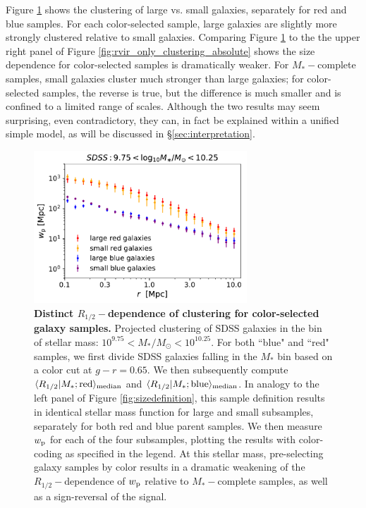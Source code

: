 \documentclass[usenatbib,usegraphicx,letterpaper]{mn2e}
\newcommand{\rhalf}{R_{1/2}}
\newcommand{\mstar}{M_{\ast}}
\newcommand{\wproj}{w_{\rm p}}
\newcommand{\median}[2]{\langle{#1}\vert{#2}\rangle_{\rm median}}
\newcommand{\msun}{M_\odot}
\begin{document}
Figure \ref{fig:colorclustering} shows the clustering of large vs. small galaxies, separately for red and blue samples. For each color-selected sample, large galaxies are slightly more strongly clustered relative to small galaxies. Comparing Figure \ref{fig:colorclustering} to the the upper right panel of Figure \ref{fig:rvir_only_clustering_absolute} shows the size dependence for color-selected samples is dramatically weaker.   For $\mstar-$complete samples, small galaxies cluster much stronger than large galaxies; for color-selected samples, the reverse is true, but the difference is much smaller and is confined to a limited range of scales.  Although the two results may seem surprising, even contradictory, they can, in fact be 
explained within a unified simple model, as will be discussed in \S\ref{sec:interpretation}.

\begin{figure}
\centering
\includegraphics[width=8cm]{FIGS/color_selected_size_dependent_clustering.pdf}
\caption{
{\bf Distinct $\rhalf-$dependence of clustering for color-selected galaxy samples.}
Projected clustering of SDSS galaxies in the bin of stellar mass: $10^{9.75}<\mstar/\msun<10^{10.25}.$ For both ``blue" and ``red" samples, we first divide SDSS galaxies falling in the $\mstar$ bin based on a color cut at $g-r=0.65.$ We then subsequently compute $\median{\rhalf}{\mstar; {\rm red}}$ and $\median{\rhalf}{\mstar; {\rm blue}}$. In analogy to the left panel of Figure \ref{fig:sizedefinition}, this sample definition results in identical stellar mass function for large and small subsamples, separately for both red and blue parent samples. We then measure $\wproj$ for each of the four subsamples, plotting the results with color-coding as specified in the legend. At this stellar mass, pre-selecting galaxy samples by color results in a dramatic weakening of the $\rhalf-$dependence of $\wproj$ relative to $\mstar-$complete samples, as well as a sign-reversal of the signal. 
}
\label{fig:colorclustering}
\end{figure}
\end{document}
